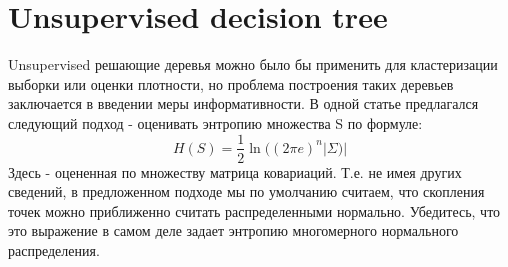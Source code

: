 \documentclass[11pt]{article}
\begin{document}
\section{Unsupervised decision tree}
Unsupervised решающие деревья можно было бы применить для кластеризации выборки или
оценки плотности, но проблема построения таких деревьев заключается в введении меры
информативности. В одной статье предлагался следующий подход - оценивать энтропию
множества S по формуле:
\begin{displaymath}
H(S) = \frac{1}{2}\ln{((2\pi e)^{n} |\Sigma)|}
\end{displaymath}
Здесь \Sigma - оцененная по множеству матрица ковариаций. Т.е. не имея других сведений, в
предложенном подходе мы по умолчанию считаем, что скопления точек можно приближенно
считать распределенными нормально. Убедитесь, что это выражение в самом деле задает
энтропию многомерного нормального распределения.
\end{document}
